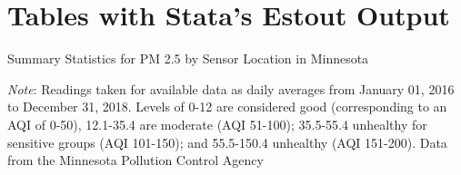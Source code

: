 
\section{Tables with Stata's Estout Output}\label{sec:tables-with-estout}



\begin{singlespace}
\begin{table}[!htbp]
\caption{Summary Statistics for PM 2.5 by Sensor Location in Minnesota} \label{tab:city-sum-stats}
\begin{center}


\begin{minipage}{0.7\textwidth}
\small{\textit{Note}: Readings taken for available data as daily averages from January 01, 2016 to December 31, 2018. Levels of 0-12 are considered good (corresponding to an AQI of 0-50), 12.1-35.4 are moderate (AQI 51-100); 35.5-55.4 unhealthy for sensitive groups (AQI 101-150); and 55.5-150.4 unhealthy (AQI 151-200). Data from the Minnesota Pollution Control Agency}
\end{minipage}	  

\end{center}
\end{table}
\end{singlespace}



